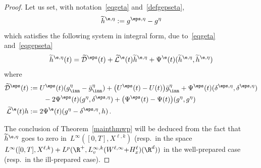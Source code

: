 \begin{proof}
Let us set, with notation~\eqref{eqgeta} and~\eqref{defgepseta},
\[
\widetilde h^{\e,\eta} := g^{\eps,\eta} - g^\eta
\]
which satisfies the following system in integral form, due to~\eqref{eqgeta} and~\eqref{eqgepseta}
\begin{equation}\label{integralformtildeheps}
\widetilde h^{\e,\eta}(t) = \mathcal{\widetilde D}^{\eps}(t) + \mathcal{\widetilde L}^{\e}(t) \widetilde h^{\e,\eta}+ \Psi^\e(t) (\widetilde h^{\e,\eta},\widetilde h^{\e,\eta})
\end{equation}
where
\begin{align*}
\mathcal{\widetilde D}^{\eps}(t) & :=U^\eps (t) (g^\eta_{\inn} - \bar g^\eta_{\inn}) + \big(U^\eps (t) - U (t)\big)\bar g^\eta_{\inn} +\Psi^\eps (t) (\delta^{\eps,\eta}, \delta^{\eps,\eta})
\\&\qquad\, - 2 \Psi^\eps(t) (g^\eta, \delta^{\eps,\eta}) + \big(\Psi^\eps (t) - \Psi(t) \big) (g^\eta,g^\eta)\\
\widetilde {\mathcal{L}}^{\e}(t) h& := 2 \Psi^\e(t) (g^\eta- \delta^{\eps,\eta},h) \,.
\end{align*}

The conclusion of Theorem~\ref{mainthmwp} will be deduced from the fact that~$\widetilde h^{\e,\eta} $ goes to zero in~$L^\infty([0,T],X^{\ell,k})$ (resp.~in the space $L^\infty([0,T],X^{\ell,k})+ {L^p(\R^+,L^{\infty,k}_v(W^{\ell,\infty}{+ H^\ell_x})(\R^d))}$ in the well-prepared case (resp.~in the ill-prepared case).


\end{proof}
